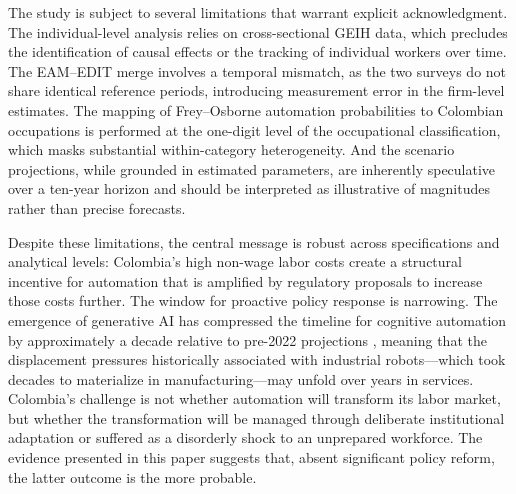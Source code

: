 \documentclass{article}
\begin{document}
The study is subject to several limitations that warrant explicit acknowledgment. The individual-level analysis relies on cross-sectional GEIH data, which precludes the identification of causal effects or the tracking of individual workers over time. The EAM--EDIT merge involves a temporal mismatch, as the two surveys do not share identical reference periods, introducing measurement error in the firm-level estimates. The mapping of Frey--Osborne automation probabilities to Colombian occupations is performed at the one-digit level of the occupational classification, which masks substantial within-category heterogeneity. And the scenario projections, while grounded in estimated parameters, are inherently speculative over a ten-year horizon and should be interpreted as illustrative of magnitudes rather than precise forecasts.

Despite these limitations, the central message is robust across specifications and analytical levels: Colombia's high non-wage labor costs create a structural incentive for automation that is amplified by regulatory proposals to increase those costs further. The window for proactive policy response is narrowing. The emergence of generative AI has compressed the timeline for cognitive automation by approximately a decade relative to pre-2022 projections \cite{wef2025}, meaning that the displacement pressures historically associated with industrial robots---which took decades to materialize in manufacturing---may unfold over years in services. Colombia's challenge is not whether automation will transform its labor market, but whether the transformation will be managed through deliberate institutional adaptation or suffered as a disorderly shock to an unprepared workforce. The evidence presented in this paper suggests that, absent significant policy reform, the latter outcome is the more probable.


% 
\end{document}
